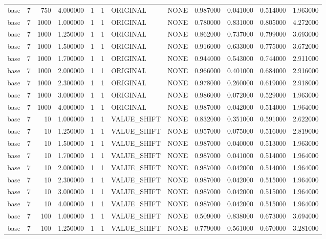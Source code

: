 \begin{tabular}{lrrrllllrrrr}
base & 7 & 750 & 4.000000 & 1 & 1 & ORIGINAL & NONE & 0.987000 & 0.041000 & 0.514000 & 1.963000 \\
base & 7 & 1000 & 1.000000 & 1 & 1 & ORIGINAL & NONE & 0.780000 & 0.831000 & 0.805000 & 4.272000 \\
base & 7 & 1000 & 1.250000 & 1 & 1 & ORIGINAL & NONE & 0.862000 & 0.737000 & 0.799000 & 3.693000 \\
base & 7 & 1000 & 1.500000 & 1 & 1 & ORIGINAL & NONE & 0.916000 & 0.633000 & 0.775000 & 3.672000 \\
base & 7 & 1000 & 1.700000 & 1 & 1 & ORIGINAL & NONE & 0.944000 & 0.543000 & 0.744000 & 2.911000 \\
base & 7 & 1000 & 2.000000 & 1 & 1 & ORIGINAL & NONE & 0.966000 & 0.401000 & 0.684000 & 2.916000 \\
base & 7 & 1000 & 2.300000 & 1 & 1 & ORIGINAL & NONE & 0.978000 & 0.260000 & 0.619000 & 2.918000 \\
base & 7 & 1000 & 3.000000 & 1 & 1 & ORIGINAL & NONE & 0.986000 & 0.072000 & 0.529000 & 1.963000 \\
base & 7 & 1000 & 4.000000 & 1 & 1 & ORIGINAL & NONE & 0.987000 & 0.042000 & 0.514000 & 1.964000 \\
base & 7 & 10 & 1.000000 & 1 & 1 & VALUE_SHIFT & NONE & 0.832000 & 0.351000 & 0.591000 & 2.622000 \\
base & 7 & 10 & 1.250000 & 1 & 1 & VALUE_SHIFT & NONE & 0.957000 & 0.075000 & 0.516000 & 2.819000 \\
base & 7 & 10 & 1.500000 & 1 & 1 & VALUE_SHIFT & NONE & 0.987000 & 0.040000 & 0.513000 & 1.963000 \\
base & 7 & 10 & 1.700000 & 1 & 1 & VALUE_SHIFT & NONE & 0.987000 & 0.041000 & 0.514000 & 1.964000 \\
base & 7 & 10 & 2.000000 & 1 & 1 & VALUE_SHIFT & NONE & 0.987000 & 0.042000 & 0.514000 & 1.964000 \\
base & 7 & 10 & 2.300000 & 1 & 1 & VALUE_SHIFT & NONE & 0.987000 & 0.042000 & 0.515000 & 1.964000 \\
base & 7 & 10 & 3.000000 & 1 & 1 & VALUE_SHIFT & NONE & 0.987000 & 0.042000 & 0.515000 & 1.964000 \\
base & 7 & 10 & 4.000000 & 1 & 1 & VALUE_SHIFT & NONE & 0.987000 & 0.042000 & 0.515000 & 1.964000 \\
base & 7 & 100 & 1.000000 & 1 & 1 & VALUE_SHIFT & NONE & 0.509000 & 0.838000 & 0.673000 & 3.694000 \\
base & 7 & 100 & 1.250000 & 1 & 1 & VALUE_SHIFT & NONE & 0.779000 & 0.561000 & 0.670000 & 3.281000 \\

\end{tabular}
